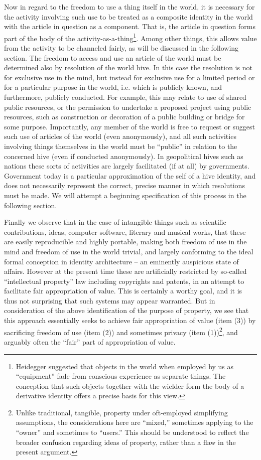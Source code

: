 \documentclass[pra,twocolumn,groupedaddress,10pt]{revtex4}
\theoremstyle{definition}
\begin{document}
Now in regard to the freedom to use a thing itself in the world, it is necessary for the activity involving such use to be treated as a composite identity in the world with the article in question as a component. That is, the article in question forms part of the body of the activity-as-a-thing\footnote{Heidegger\cite{heidegger} suggested that objects in the world when employed by us as ``equipment'' fade from conscious experience as separate things. The conception that such objects together with the wielder form the body of a derivative identity offers a precise basis for this view.}. Among other things, this allows value from the activity to be channeled fairly, as will be discussed in the following section. The freedom to access and use an article of the world must be determined also by resolution of the world hive. In this case the resolution is not for exclusive use in the mind, but instead for exclusive use for a limited period or for a particular purpose in the world, i.e. which is publicly known, and furthermore, publicly conducted. For example, this may relate to use of shared public resources, or the permission to undertake a proposed project using public resources, such as construction or decoration of a public building or bridge for some purpose. Importantly, any member of the world is free to request or suggest such use of articles of the world (even anonymously), and all such activities involving things themselves in the world must be ``public'' in relation to the concerned hive (even if conducted anonymously). In geopolitical hives such as nations these sorts of activities are largely facilitated (if at all) by governments. Government today is a particular approximation of the self of a hive identity, and does not necessarily represent the correct, precise manner in which resolutions must be made. We will attempt a beginning specification of this process in the following section.

Finally we observe that in the case of intangible things such as scientific contributions, ideas, computer software, literary and musical works, that these are easily reproducible and highly portable, making both freedom of use in the mind and freedom of use in the world trivial, and largely conforming to the ideal formal conception in identity architecture -- an eminently auspicious state of affairs. However at the present time these are artificially restricted by so-called ``intellectual property'' law including copyrights and patents, in an attempt to facilitate fair appropriation of value. This is certainly a worthy goal, and it is thus not surprising that such systems may appear warranted. But in consideration of the above identification of the purpose of property, we see that this approach essentially seeks to achieve fair appropriation of value (item (3)) by sacrificing freedom of use (item (2)) and sometimes privacy (item (1))\footnote{Unlike traditional, tangible, property under oft-employed simplifying assumptions, the considerations here are ``mixed,'' sometimes applying to the ``owner'' and sometimes to ``users.'' This should be understood to reflect the broader confusion regarding ideas of property, rather than a flaw in the present argument.}, and arguably often the ``fair'' part of appropriation of value.
\end{document}
